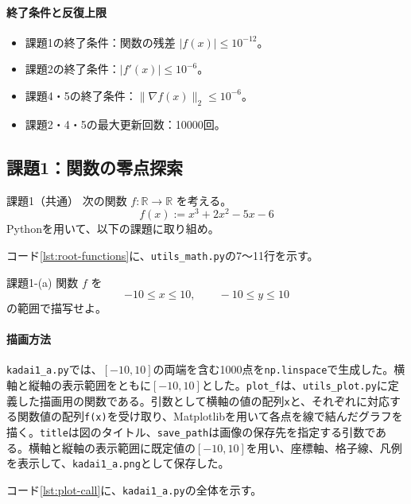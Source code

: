 \documentclass[a4j]{jarticle}
\begin{document}
\paragraph{終了条件と反復上限}
\begin{itemize}
  \item 課題1の終了条件：関数の残差 $|f(x)|\le10^{-12}$。
  \item 課題2の終了条件：$|f'(x)|\le10^{-6}$。
  \item 課題4・5の終了条件：$\|\nabla f(x)\|_2\le10^{-6}$。
  \item 課題2・4・5の最大更新回数：10000回。
\end{itemize}

\subsection{課題1：関数の零点探索}
\begin{itembox}[l]{課題1（共通）}
次の関数 $f:\mathbb{R}\to\mathbb{R}$ を考える。
\[
f(x):=x^3+2x^2-5x-6
\]
Pythonを用いて、以下の課題に取り組め。
\end{itembox}
\par\noindent
コード\ref{lst:root-functions}に、\texttt{utils\_math.py}の7〜11行を示す。
\par




\begin{itembox}[l]{課題1-(a)}
関数 $f$ を
\[
-10\le x\le 10,\qquad -10\le y\le 10
\]
の範囲で描写せよ。
\end{itembox}
\paragraph{描画方法}

\texttt{kadai1\_a.py}では、$[-10,10]$の両端を含む1000点を\texttt{np.linspace}で生成した。横軸と縦軸の表示範囲をともに$[-10,10]$とした。\texttt{plot\_f}は、\texttt{utils\_plot.py}に定義した描画用の関数である。引数として横軸の値の配列\texttt{x}と、それぞれに対応する関数値の配列\texttt{f(x)}を受け取り、Matplotlibを用いて各点を線で結んだグラフを描く。\texttt{title}は図のタイトル、\texttt{save\_path}は画像の保存先を指定する引数である。横軸と縦軸の表示範囲に既定値の$[-10,10]$を用い、座標軸、格子線、凡例を表示して、\texttt{kadai1\_a.png}として保存した。


\par\noindent
コード\ref{lst:plot-call}に、\texttt{kadai1\_a.py}の全体を示す。
\par

\end{document}
